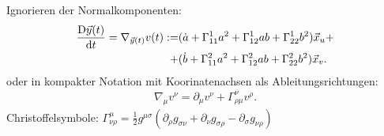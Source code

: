 \documentclass[mathserif]{beamer}
\newcommand{\vx}{\vec{x}}
\newcommand{\vy}{\vec{y}}
\theoremstyle{definition}
\begin{document}
	\begin{frame}
		Ignorieren der Normalkomponenten:
		\begin{align*}
			\frac{{\rm D} \vy(t)}{{\rm d}t}=\nabla_{\vy(t)} v(t) :=& (\dot{a} + \Gamma^1_{11}a^2+\Gamma^1_{12}ab+\Gamma^1_{22}b^2)\vx_u+\notag\\
			+&(\dot{b} + \Gamma^2_{11}a^2+\Gamma^2_{12}ab+\Gamma^2_{22}b^2)\vx_v.
		\end{align*}
		\pause
		oder in kompakter Notation mit Koorinatenachsen als Ableitungsrichtungen:
		\begin{align*}
			\nabla_\mu v^\nu=\partial_\mu v^\nu +\Gamma^\nu_{\rho\mu}v^\rho.
		\end{align*}
		\pause
		Christoffelsymbole: $\Gamma^\mu_{\nu\rho}=\frac{1}{2}g^{\mu\sigma}(\partial_\rho g_{\sigma \nu}+\partial_\nu g_{\sigma \rho}-\partial_\sigma g_{\nu\rho})$
	\end{frame}
\end{document}

